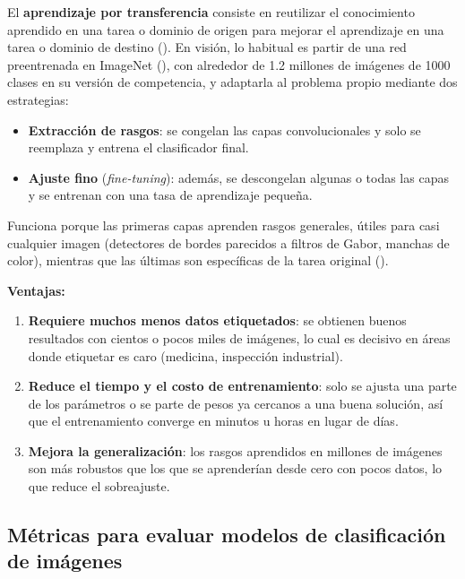 \documentclass[11pt,letterpaper]{article}
\makeatletter
\newcommand{\cit@chk}[1]{\ifcsdef{citA@#1}{}{\PackageError{citas}{Cita no definida: #1}{}}}
\newcommand{\cit@item}[1]{\cit@chk{#1}\cit@sep\csuse{citA@#1}, \csuse{citY@#1}\gdef\cit@sep{; }}
\newcommand{\parencite}[1]{(\gdef\cit@sep{}\forcsvlist{\cit@item}{#1})}
\makeatother
\begin{document}
El \textbf{aprendizaje por transferencia} consiste en reutilizar el conocimiento aprendido en una tarea o dominio de origen para mejorar el aprendizaje en una tarea o dominio de destino \parencite{pan2010}. En visión, lo habitual es partir de una red preentrenada en ImageNet \parencite{deng2009}, con alrededor de 1.2 millones de imágenes de 1000 clases en su versión de competencia, y adaptarla al problema propio mediante dos estrategias:
\begin{itemize}
  \item \textbf{Extracción de rasgos}: se congelan las capas convolucionales y solo se reemplaza y entrena el clasificador final.
  \item \textbf{Ajuste fino} (\emph{fine-tuning}): además, se descongelan algunas o todas las capas y se entrenan con una tasa de aprendizaje pequeña.
\end{itemize}
Funciona porque las primeras capas aprenden rasgos generales, útiles para casi cualquier imagen (detectores de bordes parecidos a filtros de Gabor, manchas de color), mientras que las últimas son específicas de la tarea original \parencite{yosinski2014}.

\noindent\textbf{Ventajas:}
\begin{enumerate}
  \item \textbf{Requiere muchos menos datos etiquetados}: se obtienen buenos resultados con cientos o pocos miles de imágenes, lo cual es decisivo en áreas donde etiquetar es caro (medicina, inspección industrial).
  \item \textbf{Reduce el tiempo y el costo de entrenamiento}: solo se ajusta una parte de los parámetros o se parte de pesos ya cercanos a una buena solución, así que el entrenamiento converge en minutos u horas en lugar de días.
  \item \textbf{Mejora la generalización}: los rasgos aprendidos en millones de imágenes son más robustos que los que se aprenderían desde cero con pocos datos, lo que reduce el sobreajuste.
\end{enumerate}

\subsection{Métricas para evaluar modelos de clasificación de imágenes}
\label{sec:metricas}
\end{document}
